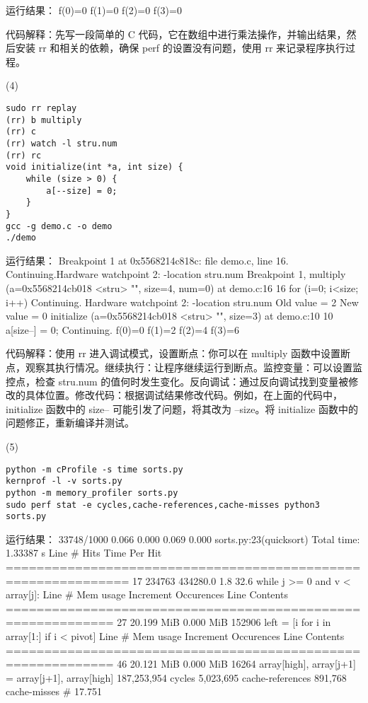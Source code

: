 \documentclass[a4paper, 12pt]{article}
\begin{document}
{\color{blue}
运行结果：
f(0)=0
f(1)=0
f(2)=0
f(3)=0
}

代码解释：先写一段简单的 C 代码，它在数组中进行乘法操作，并输出结果，然后安装 rr 和相关的依赖，确保 perf 的设置没有问题，使用 rr 来记录程序执行过程。

(4)
\begin{verbatim}
sudo rr replay
(rr) b multiply
(rr) c
(rr) watch -l stru.num
(rr) rc
void initialize(int *a, int size) {
    while (size > 0) {
        a[--size] = 0;
    }
}
gcc -g demo.c -o demo
./demo
\end{verbatim}

{\color{blue}
运行结果：
Breakpoint 1 at 0x5568214c818c: file demo.c, line 16.
Continuing.Hardware watchpoint 2: -location stru.num
Breakpoint 1, multiply (a=0x5568214cb018 <stru> "", size=4, num=0) at demo.c:16
16              for (i=0; i<size; i++)
Continuing.
Hardware watchpoint 2: -location stru.num
Old value = 2
New value = 0
initialize (a=0x5568214cb018 <stru> "", size=3) at demo.c:10
10                      a[size--] = 0;
Continuing.
f(0)=0
f(1)=2
f(2)=4
f(3)=6
}

代码解释：使用 rr 进入调试模式，设置断点：你可以在 multiply 函数中设置断点，观察其执行情况。继续执行：让程序继续运行到断点。监控变量：可以设置监控点，检查 stru.num 的值何时发生变化。反向调试：通过反向调试找到变量被修改的具体位置。修改代码：根据调试结果修改代码。例如，在上面的代码中，initialize 函数中的 size-- 可能引发了问题，将其改为 --size。将 initialize 函数中的问题修正，重新编译并测试。

(5)
\begin{verbatim}
python -m cProfile -s time sorts.py
kernprof -l -v sorts.py
python -m memory_profiler sorts.py
sudo perf stat -e cycles,cache-references,cache-misses python3 sorts.py
\end{verbatim}

{\color{blue}
运行结果：
33748/1000    0.066    0.000    0.069    0.000 sorts.py:23(quicksort)
Total time: 1.33387 s
Line \#      Hits         Time  Per Hit   %
==============================================================
   17    234763     434280.0      1.8     32.6    while j >= 0 and v < array[j]:
Line \#    Mem usage    Increment  Occurences   Line Contents
============================================================
   27   20.199 MiB    0.000 MiB      152906       left = [i for i in array[1:] if i < pivot]
Line \#    Mem usage    Increment  Occurences   Line Contents
============================================================
   46   20.121 MiB    0.000 MiB       16264       array[high], array[j+1] = array[j+1], array[high]
   187,253,954      cycles
     5,023,695      cache-references
       891,768      cache-misses              \#   17.751 %
}
\end{document}
